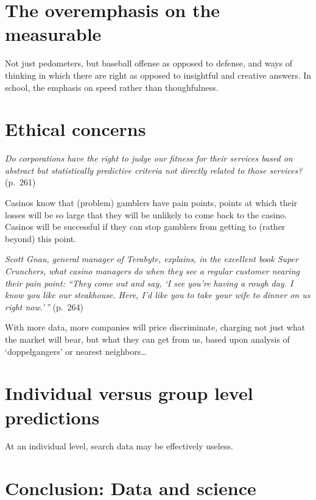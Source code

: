 \documentclass[]{book}
\theoremstyle{definition}
\theoremstyle{definition}
\theoremstyle{definition}
\theoremstyle{remark}
\begin{document}
\section{The overemphasis on the
measurable}\label{the-overemphasis-on-the-measurable}

Not just pedometers, but baseball offense as opposed to defense, and
ways of thinking in which there are right as opposed to insightful and
creative answers. In school, the emphasis on speed rather than
thoughfulness.

\section{Ethical concerns}\label{ethical-concerns}

\emph{Do corporations have the right to judge our fitness for their
services based on abstract but statistically predictive criteria not
directly related to those services?} (p.~261)

Casinos know that (problem) gamblers have pain points, points at which
their losses will be so large that they will be unlikely to come back to
the casino. Casinos will be successful if they can stop gamblers from
getting to (rather beyond) this point.

\emph{Scott Gnau, general manager of Terabyte, explains, in the
excellent book Super Crunchers, what casino managers do when they see a
regular customer nearing their pain point: ``They come out and say, `I
see you're having a rough day. I know you like our steakhouse. Here, I'd
like you to take your wife to dinner on us right now.'\,''} (p.~264)

With more data, more companies will price discriminate, charging not
just what the market will bear, but what they can get from us, based
upon analysis of `doppelgangers' or nearest neighbors\ldots{}

\section{Individual versus group level
predictions}\label{individual-versus-group-level-predictions}

At an individual level, search data may be effectively useless.

\section{Conclusion: Data and
science}\label{conclusion-data-and-science}
\end{document}
